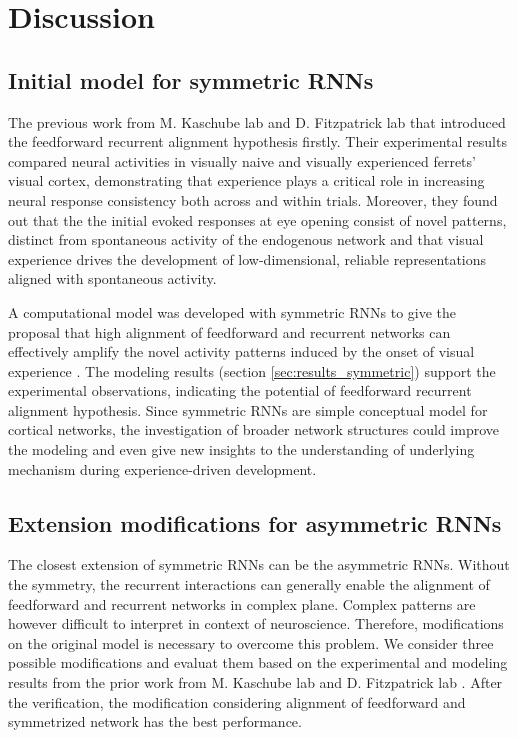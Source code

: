 \documentclass[11pt]{article}
\begin{document}
	\section{Discussion}
	\subsection*{Initial model for symmetric RNNs}
	The previous work from M. Kaschube lab and D. Fitzpatrick lab \cite{tragenap2023nature} that introduced the feedforward recurrent alignment hypothesis firstly. Their experimental results compared neural activities in visually naive and visually experienced ferrets' visual cortex, demonstrating that experience plays a critical role in increasing neural response consistency both across and within trials. Moreover, they found out that the  the initial evoked responses at eye opening consist of novel patterns, distinct from spontaneous activity of the endogenous network and that visual experience drives the development of low-dimensional, reliable representations aligned with spontaneous activity. 
	
	A computational model was developed with symmetric RNNs to give the proposal that high alignment of feedforward and recurrent networks can effectively amplify the novel activity patterns induced by the onset of visual experience \cite{tragenap2023nature}. The modeling results (section \ref{sec:results_symmetric}) support the experimental observations, indicating the potential of feedforward recurrent alignment hypothesis. Since symmetric RNNs are simple conceptual model for cortical networks, the investigation of broader network structures could improve the modeling and even give new insights to the understanding of underlying mechanism during experience-driven development. 
	
	\subsection*{Extension modifications for asymmetric RNNs}
	The closest extension of symmetric RNNs can be the asymmetric RNNs. Without the symmetry, the recurrent interactions can generally enable the alignment of feedforward and recurrent networks in complex plane. Complex patterns are however difficult to interpret in context of neuroscience. Therefore, modifications on the original model is necessary to overcome this problem. We consider three possible modifications and evaluat them based on the experimental and modeling results from the prior work from M. Kaschube lab and D. Fitzpatrick lab \cite{tragenap2023nature}. After the verification, the modification considering alignment of feedforward and symmetrized network has the best performance. 
	
\end{document}
